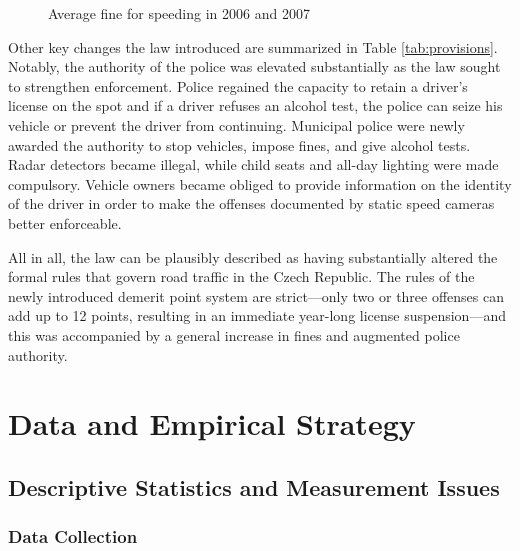 \documentclass[12pt]{article}
\begin{document}
\begin{figure}[t]
  \caption{Average fine for speeding in 2006 and 2007}
  \label{fig:fines}
\end{figure}

Other key changes the law introduced are summarized in Table
\ref{tab:provisions}. Notably, the authority of the police was elevated
substantially as the law sought to strengthen enforcement. Police regained the
capacity to retain a driver's license on the spot and if a driver refuses an
alcohol test, the police can seize his vehicle or prevent the driver from
continuing. Municipal police were newly awarded the authority to stop vehicles,
impose fines, and give alcohol tests.  Radar detectors became illegal, while
child seats and all-day lighting were made compulsory. Vehicle owners became
obliged to provide information on the identity of the driver in order to make
the offenses documented by static speed cameras better enforceable. 

All in all, the law can be plausibly described as having substantially altered
the formal rules that govern road traffic in the Czech Republic. The rules of
the newly introduced demerit point system are strict---only two or three
offenses can add up to 12 points, resulting in an immediate year-long license
suspension---and this was accompanied by a general increase in fines and
augmented police authority. 

\section{Data and Empirical Strategy} %
\label{sec:data-and-strategy}

\subsection{Descriptive Statistics and Measurement Issues} %
\label{subsec:descriptive-statistics}

\subsubsection{Data Collection} %
\end{document}
